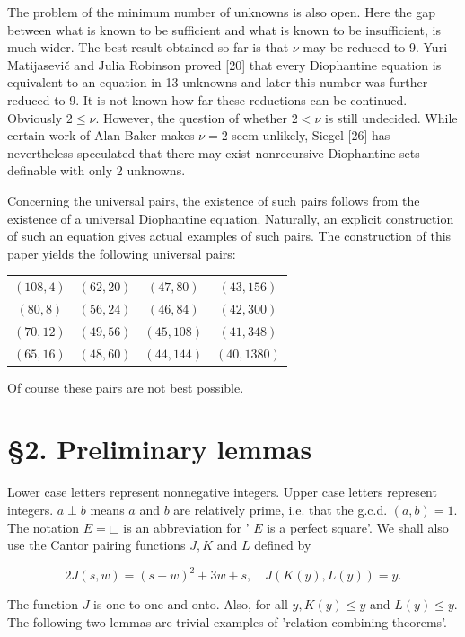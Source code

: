 \documentclass[11pt,a4paper]{article}
\newcommand{\origpage}[1]{\marginnote{\footnotesize\textbf{[#1]}}}
\newcommand{\square}{\mdlgwhtsquare}
\begin{document}
The problem of the minimum number of unknowns is also open. Here the gap between what is known to be sufficient and what is known to be insufficient, is much wider. The best result obtained so far is that $\nu$ may be reduced to 9. Yuri Matijasevič and Julia Robinson proved [20] that every Diophantine equation is equivalent to an equation in 13 unknowns and later this number was further reduced to 9. It is not known how far these reductions can be continued. Obviously $2 \leq \nu$. However, the question of whether $2<\nu$ is still undecided. While certain work of Alan Baker makes $\nu=2$ seem unlikely, Siegel [26] has nevertheless speculated that there may exist nonrecursive Diophantine sets definable with only 2 unknowns.

Concerning the universal pairs, the existence of such pairs follows from the existence of a universal Diophantine equation. Naturally, an explicit construction of such an equation gives actual examples of such pairs. The construction of this paper yields the following universal pairs:

\begin{center}
\begin{tabular}{cccc}
\toprule
$(108,4)$ & $(62,20)$ & $(47,80)$ & $(43,156)$\\
$(80,8)$ & $(56,24)$ & $(46,84)$ & $(42,300)$\\
$(70,12)$ & $(49,56)$ & $(45,108)$ & $(41,348)$\\
$(65,16)$ & $(48,60)$ & $(44,144)$ & $(40,1380)$\\
\bottomrule
\end{tabular}
\end{center}

Of course these pairs are not best possible.

\section*{§2. Preliminary lemmas} \origpage{340}Lower case letters represent nonnegative integers. Upper case letters represent integers. $a \perp b$ means $a$ and $b$ are relatively prime, i.e. that the g.c.d. $(a,b)=1$. The notation $E=\square$ is an abbreviation for ' $E$ is a perfect square'. We shall also use the Cantor pairing functions $J, K$ and $L$ defined by

$$
2 J(s, w)=(s+w)^{2}+3 w+s, \quad J(K(y), L(y))=y .
$$

The function $J$ is one to one and onto. Also, for all $y, K(y) \leq y$ and $L(y) \leq y$. The following two lemmas are trivial examples of 'relation combining theorems'.
\end{document}
